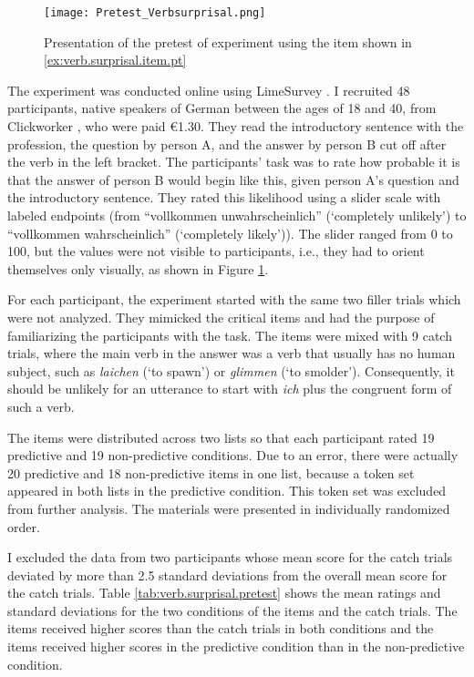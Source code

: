 \begin{figure}
\centering
\texttt{[image: Pretest\_Verbsurprisal.png]}
\caption[Presentation of the pretest of experiment ]{Presentation of the pretest of experiment  using the item shown in \ref{ex:verb.surprisal.item.pt}}
\label{fig:pretest.verbsurprisal}
\end{figure}

The experiment was conducted online using LimeSurvey \citep{limesurveygmbh}.
I recruited 48 participants, native speakers of German between the ages of 18 and 40, from Clickworker \citep{clickworker2022}, who were paid €1.30.
They read the introductory sentence with the profession, the question by person A, and the answer by person B cut off after the verb in the left bracket.
The participants' task was to rate how probable it is that the answer of person B would begin like this, given person A's question and the introductory sentence.
They rated this likelihood using a slider scale with labeled endpoints (from ``vollkommen unwahrscheinlich'' (`completely unlikely') to ``vollkommen wahrscheinlich'' (`completely likely')).
The slider ranged from 0 to 100, but the values were not visible to participants, i.e., they had to orient themselves only visually, as shown in Figure \ref{fig:pretest.verbsurprisal}.

For each participant, the experiment started with the same two filler trials which were not analyzed.
They mimicked the critical items and had the purpose of familiarizing the participants with the task.
The items were mixed with 9 catch trials, where the main verb in the answer was a verb that usually has no human subject, such as \textit{laichen} (`to spawn') or \textit{glimmen} (`to smolder').
Consequently, it should be unlikely for an utterance to start with \textit{ich} plus the congruent form of such a verb.

The items were distributed across two lists so that each participant rated 19 predictive and 19 non-predictive conditions.
Due to an error, there were actually 20 predictive and 18 non-predictive items in one list, because a token set appeared in both lists in the predictive condition.
This token set was excluded from further analysis.
The materials were presented in individually randomized order.

I excluded the data from two participants whose mean score for the catch trials deviated by more than 2.5 standard deviations from the overall mean score for the catch trials.
Table \ref{tab:verb.surprisal.pretest} shows the mean ratings and standard deviations for the two conditions of the items and the catch trials.
The items received higher scores than the catch trials in both conditions and the items received higher scores in the predictive condition than in the non-predictive condition.

